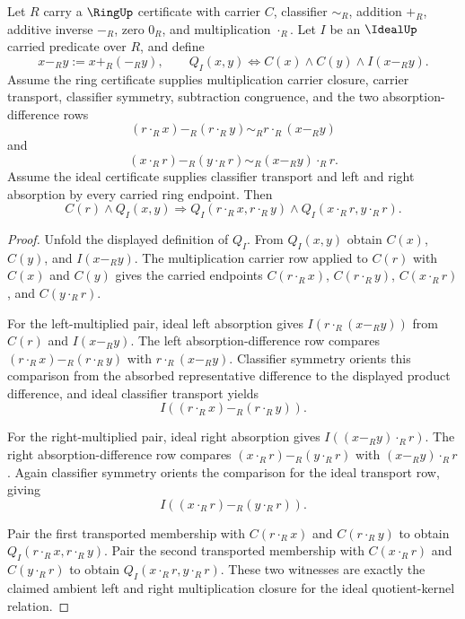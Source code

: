 \begin{theorem}
\label{thm:ideal-quotient-kernel-absorption-closure}
Let $R$ carry a $\RingUp$ certificate with carrier $C$, classifier $\sim_R$, addition $+_R$, additive inverse $-_R$, zero $0_R$, and multiplication $\cdot_R$. Let $I$ be an $\IdealUp$ carried predicate over $R$, and define
$$
x-_R y:=x+_R(-_R y),
\qquad
Q_I(x,y)\Longleftrightarrow C(x)\land C(y)\land I(x-_R y).
$$
Assume the ring certificate supplies multiplication carrier closure, carrier transport, classifier symmetry, subtraction congruence, and the two absorption-difference rows
$$
(r\cdot_R x)-_R(r\cdot_R y)\sim_R r\cdot_R(x-_R y)
$$
and
$$
(x\cdot_R r)-_R(y\cdot_R r)\sim_R (x-_R y)\cdot_R r.
$$
Assume the ideal certificate supplies classifier transport and left and right absorption by every carried ring endpoint. Then
$$
C(r)\land Q_I(x,y)
\Longrightarrow
Q_I(r\cdot_R x,r\cdot_R y)\land Q_I(x\cdot_R r,y\cdot_R r).
$$
\end{theorem}
\begin{proof}
Unfold the displayed definition of $Q_I$. From $Q_I(x,y)$ obtain $C(x)$, $C(y)$, and $I(x-_R y)$. The multiplication carrier row applied to $C(r)$ with $C(x)$ and $C(y)$ gives the carried endpoints $C(r\cdot_R x)$, $C(r\cdot_R y)$, $C(x\cdot_R r)$, and $C(y\cdot_R r)$.

For the left-multiplied pair, ideal left absorption gives $I(r\cdot_R(x-_R y))$ from $C(r)$ and $I(x-_R y)$. The left absorption-difference row compares $(r\cdot_R x)-_R(r\cdot_R y)$ with $r\cdot_R(x-_R y)$. Classifier symmetry orients this comparison from the absorbed representative difference to the displayed product difference, and ideal classifier transport yields
$$
I((r\cdot_R x)-_R(r\cdot_R y)).
$$

For the right-multiplied pair, ideal right absorption gives $I((x-_R y)\cdot_R r)$. The right absorption-difference row compares $(x\cdot_R r)-_R(y\cdot_R r)$ with $(x-_R y)\cdot_R r$. Again classifier symmetry orients the comparison for the ideal transport row, giving
$$
I((x\cdot_R r)-_R(y\cdot_R r)).
$$

Pair the first transported membership with $C(r\cdot_R x)$ and $C(r\cdot_R y)$ to obtain $Q_I(r\cdot_R x,r\cdot_R y)$. Pair the second transported membership with $C(x\cdot_R r)$ and $C(y\cdot_R r)$ to obtain $Q_I(x\cdot_R r,y\cdot_R r)$. These two witnesses are exactly the claimed ambient left and right multiplication closure for the ideal quotient-kernel relation.
\end{proof}


